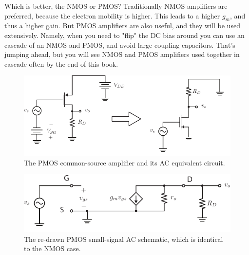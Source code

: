 Which is better, the NMOS or PMOS?  Traditionally NMOS amplifiers are preferred, because the electron mobility is higher.  This leads to a higher $g_m$, and thus a higher gain.  But PMOS amplifiers are also useful, and they will be used extensively.  Namely, when you need to "flip" the DC bias around you can use an cascade of an NMOS and PMOS, and avoid large coupling capacitors.  That's jumping ahead, but you will see NMOS and PMOS amplifiers used together in cascade often by the end of this book.  
\begin{figure}[H]
\begin{center}
\includegraphics[scale=1.15]{cs_amp_pmos_ss1}
\end{center}
\caption{The PMOS common-source amplifier and its AC equivalent circuit.}
\label{fig:cs_amp_pmos_ss1}
\end{figure}
\begin{figure}[t]
\centering
\includegraphics[scale=1.25]{csamp_pmos_ss}
\caption{The re-drawn PMOS small-signal AC schematic, which is identical to the NMOS case.} \label{fig:csamp_pmos_ss}
\end{figure}
\newpage
